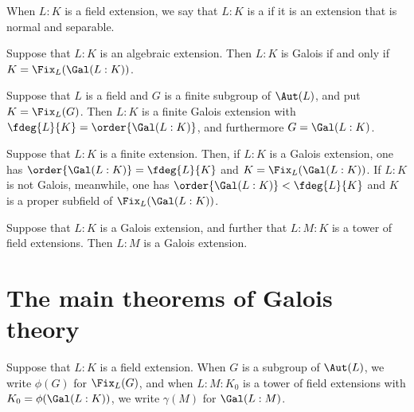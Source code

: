 \documentclass{article}
\begin{document}
\begin{tdefinition}
  When $ L:K $ is a field extension, we say that $ L:K $ is a  if it is an extension that is normal and separable.
\end{tdefinition}

\begin{ttheorem}
  Suppose that $ L:K $ is an algebraic extension.
  Then $ L:K $ is Galois if and only if $ K=\Fix_L(\Gal(L:K)) $.
\end{ttheorem}

\begin{ttheorem}
  Suppose that $ L $ is a field and $ G $ is a finite subgroup of $ \Aut(L) $, and put $ K=\Fix_L(G) $.
  Then $ L:K $ is a finite Galois extension with $ \fdeg{L}{K}=\order{\Gal(L:K)} $, and furthermore $ G=\Gal(L:K) $.
\end{ttheorem}

\begin{ttheorem}
  Suppose that $ L:K $ is a finite extension.
  Then, if $ L:K $ is a Galois extension, one has $ \order{\Gal(L:K)}=\fdeg{L}{K} $ and $ K=\Fix_L(\Gal(L:K)) $.
  If $ L:K $ is not Galois, meanwhile, one has $ \order{\Gal(L:K)}<\fdeg{L}{K} $ and $ K $ is a proper subfield of $ \Fix_L(\Gal(L:K)) $.
\end{ttheorem}

\begin{tproposition}
  Suppose that $ L:K $ is a Galois extension, and further that $ L:M:K $ is a tower of field extensions.
  Then $ L:M $ is a Galois extension.
\end{tproposition}

\section{The main theorems of Galois theory}
\begin{tdefinition}
  Suppose that $ L:K $ is a field extension.
  When $ G $ is a subgroup of $ \Aut(L) $, we write $ \phi(G) $ for $ \Fix_L(G) $, and when $ L:M:K_0 $ is a tower of field extensions with $ K_0=\phi(\Gal(L:K)) $, we write $ \gamma(M) $ for $ \Gal(L:M) $.
\end{tdefinition}
\end{document}
